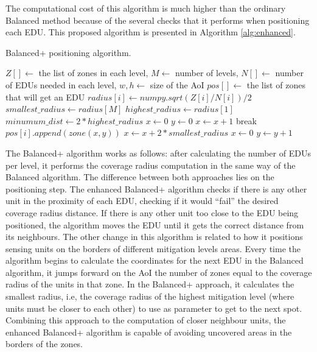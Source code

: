 \begin{refsection}
The computational cost of this algorithm is much higher than the ordinary Balanced method because of the several checks that it performs when positioning each EDU. This proposed algorithm is presented in Algorithm \ref{alg:enhanced}.

\begin{algorithm}[ht!]
    \caption{Balanced+ positioning algorithm.}
    \label{alg:enhanced}
    \begin{algorithmic}
        \REQUIRE $Z[] \gets$ the list of zones in each level, $M \gets$ number of levels, $N[] \gets$ number of EDUs needed in each level, $w, h \gets$ size of the AoI
        \ENSURE $pos[] \gets$ the list of zones that will get an EDU
            \STATE $radius[i] \gets numpy.sqrt(Z[i] / N[i]) / 2$
        \ENDFOR
        \STATE $smallest\_radius \gets radius[M]$
        \STATE $highest\_radius \gets radius[1]$
        \STATE $minumum\_dist \gets 2 * highest\_radius$
        \STATE $x \gets 0$
        \STATE $y \gets 0$
                    \STATE $x \gets x + 1$
                    \STATE break
                \ENDIF
                \STATE $pos[i].append(zone(x, y))$
                \STATE $x \gets x + 2 * smallest\_radius$
            \ENDWHILE
            \STATE $x \gets 0$
            \STATE $y \gets y + 1$
        \ENDWHILE
    \end{algorithmic}
\end{algorithm}

The Balanced+ algorithm works as follows: after calculating the number of EDUs per level, it performs the coverage radius computation in the same way of the Balanced algorithm. The difference between both approaches lies on the positioning step. The enhanced Balanced+ algorithm checks if there is any other unit in the proximity of each EDU, checking if it would ``fail'' the desired coverage radius distance. If there is any other unit too close to the EDU being positioned, the algorithm moves the EDU until it gets the correct distance from its neighbours. The other change in this algorithm is related to how it positions sensing units on the borders of different mitigation levels areas. Every time the algorithm begins to calculate the coordinates for the next EDU in the Balanced algorithm, it jumps forward on the AoI the number of zones equal to the coverage radius of the units in that zone. In the Balanced+ approach, it calculates the smallest radius, i.e, the coverage radius of the highest mitigation level (where units must be closer to each other) to use as parameter to get to the next spot. Combining this approach to the computation of closer neighbour units, the enhanced Balanced+ algorithm is capable of avoiding uncovered areas in the borders of the zones.


\end{refsection}

